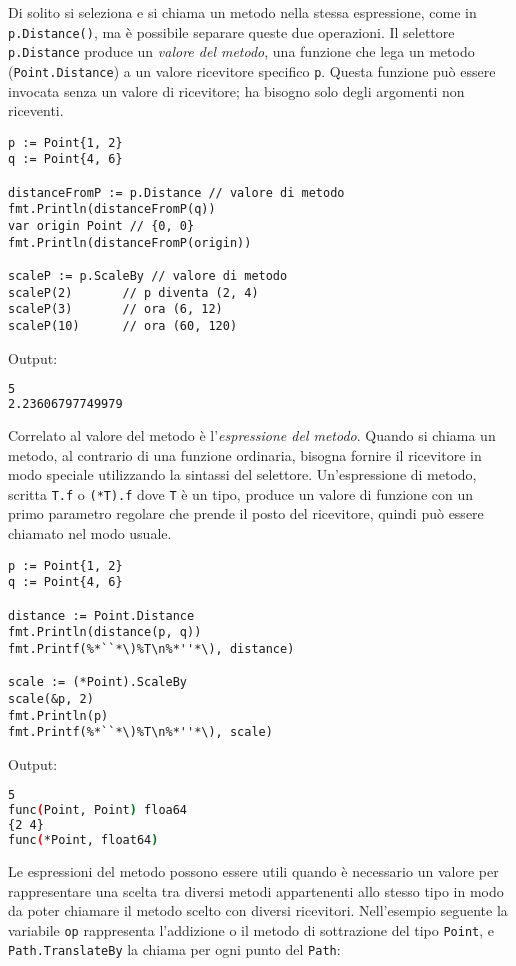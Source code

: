Di solito si seleziona e si chiama un metodo nella stessa espressione, come in \verb|p.Distance()|, ma è possibile separare queste due operazioni.
Il selettore \verb|p.Distance| produce un \textit{valore del metodo}, una funzione che lega un metodo (\verb|Point.Distance|) a un valore ricevitore specifico \verb|p|.
Questa funzione può essere invocata senza un valore di ricevitore;
ha bisogno solo degli argomenti non riceventi.
\begin{lstlisting}[frame=single, label={lst:lstlisting5-4.1}]
p := Point{1, 2}
q := Point{4, 6}

distanceFromP := p.Distance // valore di metodo
fmt.Println(distanceFromP(q))
var origin Point // {0, 0}
fmt.Println(distanceFromP(origin))

scaleP := p.ScaleBy // valore di metodo
scaleP(2)	    // p diventa (2, 4)
scaleP(3)	    // ora (6, 12)
scaleP(10)	    // ora (60, 120)
\end{lstlisting}
Output:
\begin{lstlisting}[language=bash, frame=L, label={lst:lstlisting5-4.2}]
5
2.23606797749979
\end{lstlisting}
Correlato al valore del metodo è l'\textit{espressione del metodo}.
Quando si chiama un metodo, al contrario di una funzione ordinaria, bisogna fornire il ricevitore in modo speciale utilizzando la sintassi del selettore.
Un'espressione di metodo, scritta \verb|T.f| o \verb|(*T).f| dove \verb|T| è un tipo, produce un valore di funzione con un primo parametro regolare che prende il posto del ricevitore, quindi può essere chiamato nel modo usuale.
\begin{lstlisting}[frame=single, label={lst:lstlisting5-4.3}]
p := Point{1, 2}
q := Point{4, 6}

distance := Point.Distance
fmt.Println(distance(p, q))
fmt.Printf(%*``*\)%T\n%*''*\), distance)

scale := (*Point).ScaleBy
scale(&p, 2)
fmt.Println(p)
fmt.Printf(%*``*\)%T\n%*''*\), scale)
\end{lstlisting}
Output:
\begin{lstlisting}[language=bash, frame=L, label={lst:lstlisting5-4.4}]
5
func(Point, Point) floa64
{2 4}
func(*Point, float64)
\end{lstlisting}
Le espressioni del metodo possono essere utili quando è necessario un valore per rappresentare una scelta tra diversi metodi appartenenti allo stesso tipo in modo da poter chiamare il metodo scelto con diversi ricevitori.
Nell'esempio seguente la variabile \verb|op| rappresenta l'addizione o il metodo di sottrazione del tipo \verb|Point|, e \verb|Path.TranslateBy| la chiama per ogni punto del \verb|Path|:
